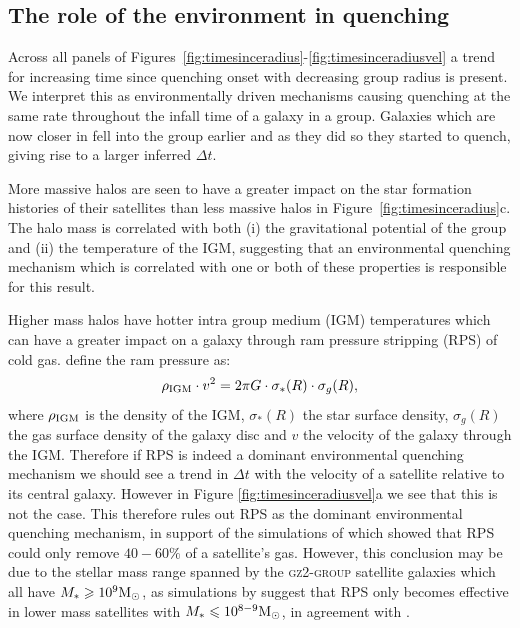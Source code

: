 \documentclass[useAMS,usenatbib]{mn2e}
\begin{document}
\subsection{The role of the environment in quenching}\label{sec:roleenv}

Across all panels of Figures~\ref{fig:timesinceradius}-\ref{fig:timesinceradiusvel} a trend for increasing time since quenching onset with decreasing group radius is present. We interpret this as environmentally driven mechanisms causing quenching at the same rate throughout the infall time of a galaxy in a group. Galaxies which are now closer in fell into the group earlier and as they did so they started to quench, giving rise to a larger inferred $\Delta t$.

More massive halos are seen to have a greater impact on the star formation histories of their satellites than less massive halos in Figure~\ref{fig:timesinceradius}c. The halo mass is correlated with both (i) the gravitational potential of the group and (ii) the temperature of the IGM, suggesting that an environmental quenching mechanism which is correlated with one or both of these properties is responsible for this result.

Higher mass halos have hotter intra group medium (IGM) temperatures \citep{shimizu03, delpopolo05} which can have a greater impact on a galaxy through ram pressure stripping (RPS) of cold gas. \cite{gunngott72} define the ram pressure as:
\begin{equation}\label{eq:rps}
\rho_{\rm{IGM}}\cdot v^2 = 2\pi G \cdot \sigma_*(R) \cdot \sigma_g(R),
\end{equation}
where $\rho_{\rm{IGM}}$ is the density of the IGM, $\sigma_*(R)$ the star surface density, $\sigma_g(R)$ the gas surface density of the galaxy disc and $v$ the velocity of the galaxy through the IGM. Therefore if RPS is indeed a dominant environmental quenching mechanism we should see a trend in $\Delta t$ with the velocity of a satellite relative to its central galaxy.  However in Figure \ref{fig:timesinceradiusvel}a we see that this is not the case. This therefore rules out RPS as the dominant environmental quenching mechanism, in support of the simulations of \citet{emerick16, fillingham16} which showed that RPS could only remove $40-60\%$ of a satellite's gas. However, this conclusion may be due to the stellar mass range spanned by the \textsc{gz2-group} satellite galaxies which all have $M_* \geq 10^9 \rm{M}_{\odot}$, as simulations by \cite{fillingham16} suggest that RPS only becomes effective in lower mass satellites with $M_* \leq 10^{8-9} \rm{M}_{\odot}$, in agreement with \cite{hester06}. 
\end{document}
